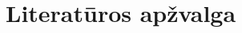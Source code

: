 \documentclass[../gnss_interference_resistant_thesis.tex]{subfiles}
\begin{document}
\section{Literatūros apžvalga}




\end{document}
